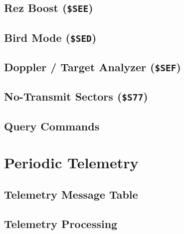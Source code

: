 \documentclass[11pt,letterpaper]{article}
\begin{document}

\subsection{Rez Boost (\texttt{\$SEE})}
\label{subsec:cmd-rezboost}


\subsection{Bird Mode (\texttt{\$SED})}
\label{subsec:cmd-bird}


\subsection{Doppler / Target Analyzer (\texttt{\$SEF})}
\label{subsec:cmd-doppler}


\subsection{No-Transmit Sectors (\texttt{\$S77})}
\label{subsec:cmd-no-transmit}


\subsection{Query Commands}
\label{subsec:cmd-queries}



\newpage
\section{Periodic Telemetry}
\label{sec:telemetry}

\subsection{Telemetry Message Table}
\label{subsec:telemetry-table}


\subsection{Telemetry Processing}
\label{subsec:telemetry-processing}
\end{document}
